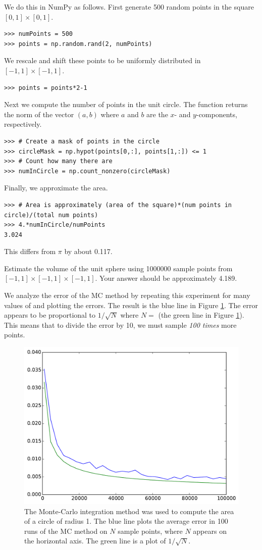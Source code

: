 We do this in NumPy as follows. First generate 500 random points in the square $[0,1] \times [0,1]$.
\begin{lstlisting}
>>> numPoints = 500
>>> points = np.random.rand(2, numPoints)
\end{lstlisting}
We rescale and shift these points to be uniformly distributed in $[-1,1]\times[-1,1]$.
\begin{lstlisting}
>>> points = points*2-1
\end{lstlisting}
Next we compute the number of points in the unit circle.
The function  returns the norm of the vector $(a, b)$ where $a$ and $b$ are the $x$- and $y$-components, respectively.
\begin{lstlisting}
>>> # Create a mask of points in the circle
>>> circleMask = np.hypot(points[0,:], points[1,:]) <= 1
>>> # Count how many there are
>>> numInCircle = np.count_nonzero(circleMask)
\end{lstlisting}
Finally, we approximate the area.
\begin{lstlisting}
>>> # Area is approximately (area of the square)*(num points in circle)/(total num points)
>>> 4.*numInCircle/numPoints
3.024
\end{lstlisting}
This differs from $\pi$ by about 0.117.

\begin{problem}
\label{prob:sphere}
Estimate the volume of the unit sphere using 1000000 sample points from $[-1,1]\times[-1,1]\times[-1,1]$. Your answer should be approximately 4.189.
\end{problem}

We analyze the error of the MC method by repeating this experiment for many values of  and plotting the errors.
The result is the blue line in Figure \ref{fig:mc_error}.
The error appears to be proportional to $1/\sqrt{N}$ where $N=$  (the green line in Figure \ref{fig:mc_error}).
This means that to divide the error by 10, we must sample \emph{100 times} more points.

\begin{figure}
\includegraphics[width=.7\textwidth]{mc_error.pdf}
\caption{The Monte-Carlo integration method was used to compute the area of a circle of radius 1.
The blue line plots the average error in 100 runs of the MC method on $N$ sample points, where $N$ appears on the horizontal axis.
The green line is a plot of $1/\sqrt{N}$. }
\label{fig:mc_error}
\end{figure}

